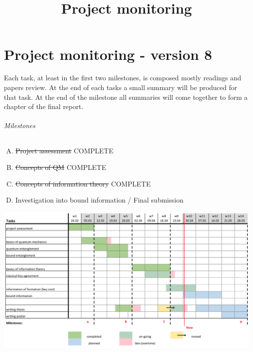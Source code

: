 \documentclass{article}
\title{Project monitoring}
\begin{document}
\part*{Project monitoring - version 8}
Each task, at least in the first two milestones, is composed mostly readings and papers review.
At the end of each tasks a small summary will be produced for that task. 
At the end of the milestone all summaries will come together to form a chapter of the final report. \\

\paragraph*{Milestones}
\begin{enumerate}[A)]
\item \sout{Project assessment} COMPLETE 
\item \sout{Concepts of QM} COMPLETE
\item \sout{Concepts of information theory} COMPLETE
\item Investigation into bound information / Final submission
\end{enumerate}

\centerline{
	\includegraphics[scale=0.5]{gantt-8.png}
}
\end{document}
